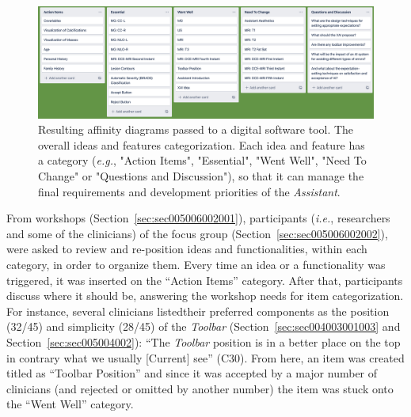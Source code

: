 
\begin{figure}[htbp]
\centering
\includegraphics[width=\columnwidth]{images/fig039}
\caption{Resulting affinity diagrams passed to a digital software tool. The overall ideas and features categorization. Each idea and feature has a category ({\it e.g.}, "Action Items", "Essential", "Went Well", "Need To Change" or "Questions and Discussion"), so that it can manage the final requirements and development priorities of the {\it Assistant}.}
\label{fig:fig039}
\end{figure}

From workshops (Section~\ref{sec:sec005006002001}), participants ({\it i.e.}, researchers and some of the clinicians) of the focus group (Section~\ref{sec:sec005006002002}), were asked to review and re-position ideas and functionalities, within each category, in order to organize them.
Every time an idea or a functionality was triggered, it was inserted on the ``Action Items'' category.
After that, participants discuss where it should be, answering the workshop needs for item categorization.
For instance, several clinicians listed\footnotemark[32] their preferred components as the position (32/45) and simplicity (28/45) of the {\it Toolbar} (Section~\ref{sec:sec004003001003} and Section~\ref{sec:sec005004002}):
``The {\it Toolbar} position is in a better place on the top in contrary what we usually [Current] see'' (C30).
From here, an item was created titled as ``Toolbar Position'' and since it was accepted by a major number of clinicians (and rejected or omitted by another number) the item was stuck onto the ``Went Well'' category.



